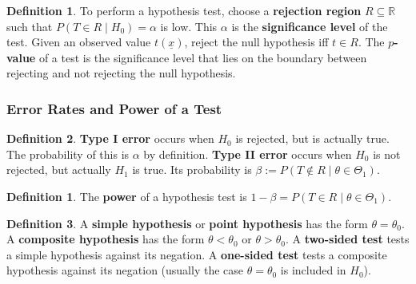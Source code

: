 \documentclass[12pt]{article}
\theoremstyle{definition}
\newtheorem{defn}{Definition}[subsection]
\newtheorem*{defn*}{Definition}
\newcommand{\R}{\mathbb{R}}
\begin{document}
\begin{defn*}
  To perform a hypothesis test, choose a \textbf{rejection region} $R \subseteq \R$ such that $P(T \in R \mid H_0) = \alpha$ is low.
  This $\alpha$ is the \textbf{significance level} of the test.
  Given an observed value $t(\underline{x})$, reject the null hypothesis iff $t \in R$.
  The \textbf{$p$-value} of a test is the significance level that lies on the boundary between rejecting and not rejecting the null hypothesis.
\end{defn*}

\subsubsection{Error Rates and Power of a Test}

\begin{defn*}
  \textbf{Type I error} occurs when $H_0$ is rejected, but is actually true.
  The probability of this is $\alpha$ by definition.
  \textbf{Type II error} occurs when $H_0$ is not rejected, but actually $H_1$ is true.
  Its probability is $\beta := P(T \notin R \mid \theta \in \Theta_1)$.
\end{defn*}

\begin{defn}
  The \textbf{power} of a hypothesis test is $1 - \beta = P(T \in R \mid \theta \in \Theta_1)$.
\end{defn}

\begin{defn*}
  A \textbf{simple hypothesis} or \textbf{point hypothesis} has the form $\theta = \theta_0$.
  A \textbf{composite hypothesis} has the form $\theta < \theta_0$ or $\theta > \theta_0$.
  A \textbf{two-sided test} tests a simple hypothesis against its negation.
  A \textbf{one-sided test} tests a composite hypothesis against its negation (usually the case $\theta = \theta_0$ is included in $H_0$).
\end{defn*}
\end{document}

